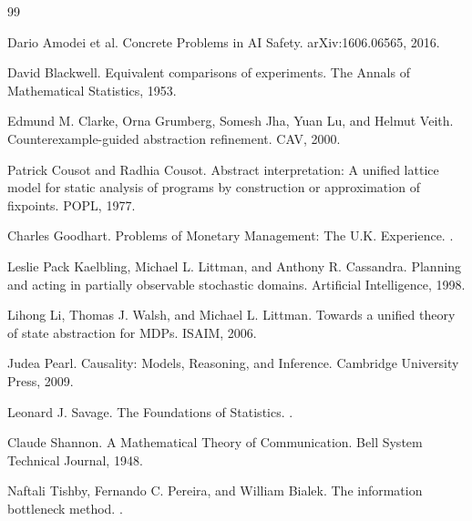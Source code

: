 \documentclass[11pt]{article}
\begin{document}
\begin{thebibliography}{99}

Dario Amodei et al.
\newblock Concrete Problems in AI Safety.
\newblock arXiv:1606.06565, 2016.

David Blackwell.
\newblock Equivalent comparisons of experiments.
\newblock The Annals of Mathematical Statistics, 1953.

Edmund M. Clarke, Orna Grumberg, Somesh Jha, Yuan Lu, and Helmut Veith.
\newblock Counterexample-guided abstraction refinement.
\newblock CAV, 2000.

Patrick Cousot and Radhia Cousot.
\newblock Abstract interpretation: A unified lattice model for static analysis of programs by construction or approximation of fixpoints.
\newblock POPL, 1977.

Charles Goodhart.
\newblock Problems of Monetary Management: The U.K. Experience.
.

Leslie Pack Kaelbling, Michael L. Littman, and Anthony R. Cassandra.
\newblock Planning and acting in partially observable stochastic domains.
\newblock Artificial Intelligence, 1998.

Lihong Li, Thomas J. Walsh, and Michael L. Littman.
\newblock Towards a unified theory of state abstraction for MDPs.
\newblock ISAIM, 2006.

Judea Pearl.
\newblock Causality: Models, Reasoning, and Inference.
\newblock Cambridge University Press, 2009.

Leonard J. Savage.
\newblock The Foundations of Statistics.
.

Claude Shannon.
\newblock A Mathematical Theory of Communication.
\newblock Bell System Technical Journal, 1948.

Naftali Tishby, Fernando C. Pereira, and William Bialek.
\newblock The information bottleneck method.
.

\end{thebibliography}
\end{document}
